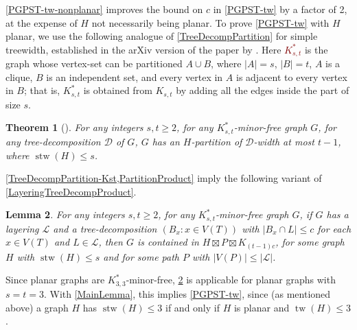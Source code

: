 \documentclass[11pt]{article}
\newcommand{\defn}[1]{\textcolor{Maroon}{\emph{#1}}}
\newcommand{\DD}{\mathcal{D}}
\renewcommand{\geq}{\geqslant}
\renewcommand{\leq}{\leqslant}
\DeclareMathOperator{\stw}{stw}
\DeclareMathOperator{\tw}{tw}
\theoremstyle{plain}
\newtheorem{thm}{Theorem}
\newtheorem{lem}[thm]{Lemma}
\theoremstyle{definition}
\newcommand{\PP}{\mathcal{P}}
\newcommand{\LL}{\mathcal{L}}
\begin{document}
		\cref{PGPST-tw-nonplanar} improves the bound on $c$ in \cref{PGPST-tw} by a factor of 2, at the expense of $H$ not necessarily being planar. To prove 
		\cref{PGPST-tw} with $H$ planar, 
		we use the following analogue of \cref{TreeDecompPartition} for simple treewidth, established in the arXiv version of the paper by \citet[Theorem~27]{ISW-arXiv}. Here \defn{$K^{\ast}_{s,t}$} is the graph whose vertex-set can be partitioned $A \cup B$, where $|A| = s$, $|B| = t$,  $A$ is a clique, $B$ is an independent set, and every vertex in $A$ is adjacent to every vertex in $B$; that is, $K^{\ast}_{s, t}$ is obtained from $K_{s, t}$ by adding all the edges inside the part of size $s$.
		
		\begin{thm}[\citep{ISW-arXiv}]
			\label{TreeDecompPartition-Kst}
			For any integers $s, t \geq 2$, for any $K^*_{s,t}$-minor-free graph $G$, for any tree-decomposition $\DD$ of $G$, $G$ has an $H$-partition of $\DD$-width at most $t-1$, where $\stw(H)\leq s$.
		\end{thm}
	
		
		\cref{TreeDecompPartition-Kst,PartitionProduct} imply the following variant of \cref{LayeringTreeDecompProduct}. 
		
		\begin{lem}
			\label{SimpleLayeringTreeDecompProduct}
			For any integers $s, t \geq 2$, for any $K^{\ast}_{s,t}$-minor-free graph $G$, if $G$ has a layering $\LL$ and a tree-decomposition $(B_x:x\in V(T))$ with $|B_x\cap L|\leq c$ for each $x\in V(T)$ and $L\in\LL$, then $G$ is contained in $H\boxtimes P\boxtimes K_{(t-1)c}$, for some graph $H$ with $\stw(H)\leq s$ and for some path $P$ with $|V(P)|\leq|\LL|$. 
		\end{lem}
		
		Since planar graphs are $K^{\ast}_{3,3}$-minor-free, \cref{SimpleLayeringTreeDecompProduct} is applicable for planar graphs with $s=t=3$. With \cref{MainLemma}, this implies \cref{PGPST-tw}, since (as mentioned above) a graph $H$ has $\stw(H)\leq 3$ if and only if $H$ is planar and $\tw(H)\leq 3$. 
		
		
		
		
		
		
\end{document}
